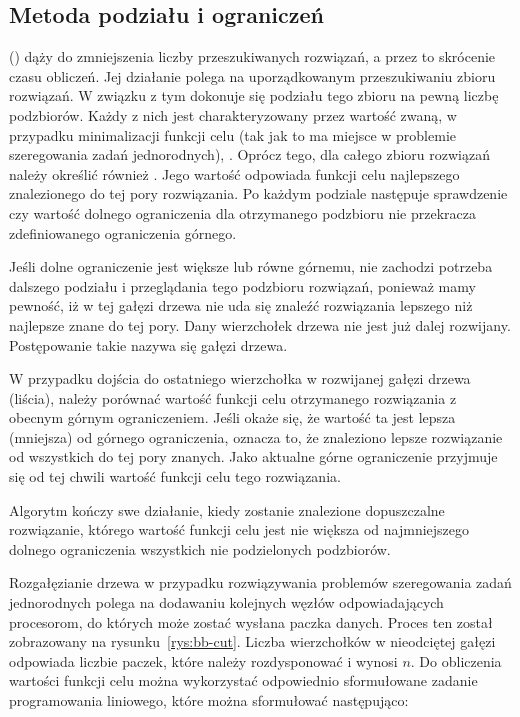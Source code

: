 \subsection{Metoda podziału i ograniczeń}

 () dąży do zmniejszenia liczby przeszukiwanych rozwiązań, a przez to skrócenie czasu obliczeń. 
Jej działanie polega na uporządkowanym przeszukiwaniu 
zbioru rozwiązań. W związku z tym dokonuje się podziału tego zbioru na pewną liczbę podzbiorów. Każdy z nich jest charakteryzowany przez wartość 
zwaną, w przypadku minimalizacji funkcji celu (tak jak to ma miejsce w problemie szeregowania zadań jednorodnych), . 
Oprócz tego, dla całego zbioru rozwiązań należy określić również . Jego wartość odpowiada funkcji celu najlepszego znalezionego 
do tej pory rozwiązania. Po każdym podziale następuje sprawdzenie czy wartość dolnego ograniczenia dla otrzymanego podzbioru nie przekracza 
zdefiniowanego ograniczenia górnego.

Jeśli dolne ograniczenie jest większe lub równe górnemu, nie zachodzi potrzeba dalszego podziału i przeglądania tego podzbioru rozwiązań, 
ponieważ mamy pewność, iż w tej gałęzi drzewa nie uda się znaleźć rozwiązania lepszego niż najlepsze znane do tej pory. Dany wierzchołek 
drzewa nie jest już dalej rozwijany. Postępowanie takie nazywa się  gałęzi drzewa.

W przypadku dojścia do ostatniego wierzchołka w rozwijanej gałęzi drzewa (liścia), należy porównać wartość funkcji celu otrzymanego rozwiązania 
z obecnym górnym ograniczeniem. Jeśli okaże się, że wartość ta jest lepsza (mniejsza) od górnego ograniczenia, oznacza to, że znaleziono lepsze 
rozwiązanie od wszystkich do tej pory znanych. Jako aktualne górne ograniczenie przyjmuje się od tej chwili wartość funkcji celu tego rozwiązania.

Algorytm kończy swe działanie, kiedy zostanie znalezione dopuszczalne rozwiązanie, którego wartość funkcji celu jest nie większa od 
najmniejszego dolnego ograniczenia wszystkich nie podzielonych podzbiorów.

Rozgałęzianie drzewa w przypadku rozwiązywania problemów szeregowania zadań jednorodnych polega na dodawaniu kolejnych węzłów odpowiadających 
procesorom, do których może zostać wysłana paczka danych. Proces ten został zobrazowany na rysunku~\vref{rys:bb-cut}. Liczba wierzchołków w 
nieodciętej gałęzi odpowiada liczbie paczek, które należy rozdysponować i wynosi $n$. Do obliczenia wartości funkcji celu można wykorzystać 
odpowiednio sformułowane zadanie programowania liniowego, które można sformułować następująco:

